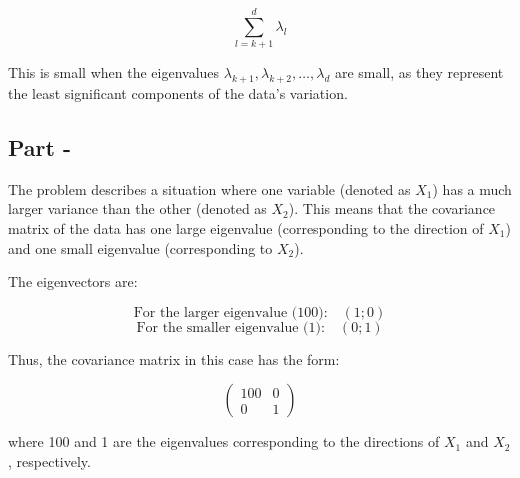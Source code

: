 \documentclass{article}
\begin{document}
\[
\sum_{l=k+1}^d \lambda_l
\]

This is small when the eigenvalues \( \lambda_{k+1}, \lambda_{k+2}, \dots, \lambda_d \) are small, as they represent the least significant components of the data's variation.

\subsection*{Part  -}

The problem describes a situation where one variable (denoted as \( X_1 \)) has a much larger variance than the other (denoted as \( X_2 \)). This means that the covariance matrix of the data has one large eigenvalue (corresponding to the direction of \( X_1 \)) and one small eigenvalue (corresponding to \( X_2 \)).

The eigenvectors are:

\[
\text{For the larger eigenvalue (100):} \quad (1; 0)
\]
\[
\text{For the smaller eigenvalue (1):} \quad (0; 1)
\]

Thus, the covariance matrix in this case has the form:

\[
\begin{pmatrix}
100 & 0 \\
0 & 1
\end{pmatrix}
\]

where 100 and 1 are the eigenvalues corresponding to the directions of \( X_1 \) and \( X_2 \), respectively.
\end{document}
